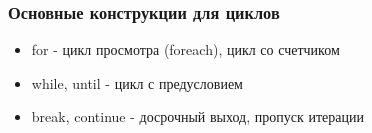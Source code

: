 \begin{frame}
\frametitle{Основные конструкции для циклов}
  \begin{itemize}
   \item \alert{for} - цикл просмотра (foreach), цикл со счетчиком 
   \item \alert{while, until} - цикл с предусловием  
   \item \alert{break, continue}  - досрочный выход, пропуск итерации
  \end{itemize}
\end{frame}
